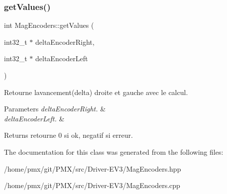 \subsubsection{\texorpdfstring{get\+Values()}{getValues()}}
{\footnotesize\ttfamily int Mag\+Encoders\+::get\+Values (\begin{DoxyParamCaption}\item[{int32\+\_\+t $\ast$}]{delta\+Encoder\+Right,  }\item[{int32\+\_\+t $\ast$}]{delta\+Encoder\+Left }\end{DoxyParamCaption})}



Retourne l\textquotesingle{}avancement(delta) droite et gauche avec le calcul. 


\begin{DoxyParams}{Parameters}
{\em delta\+Encoder\+Right.} & \\
\hline
{\em delta\+Encoder\+Left.} & \\
\hline
\end{DoxyParams}
\begin{DoxyReturn}{Returns}
retourne 0 si ok, negatif si erreur. 
\end{DoxyReturn}


The documentation for this class was generated from the following files\+:\begin{DoxyCompactItemize}
\item 
/home/pmx/git/\+P\+M\+X/src/\+Driver-\/\+E\+V3/Mag\+Encoders.\+hpp\item 
/home/pmx/git/\+P\+M\+X/src/\+Driver-\/\+E\+V3/Mag\+Encoders.\+cpp\end{DoxyCompactItemize}
